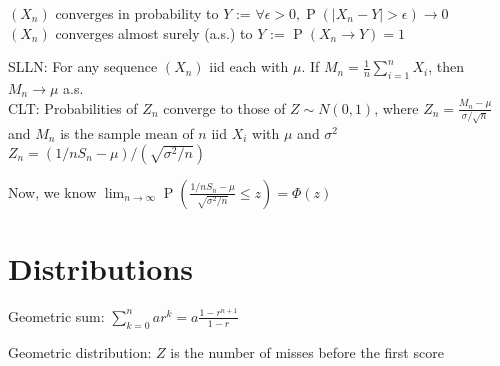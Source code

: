 \documentclass[12pt]{LatexTemplate/hw}
\renewcommand{\Pr}{\operatorname{P}}
\begin{document}
$(X_n)$ converges in probability to $Y$ := $\forall \epsilon>0, \Pr(|X_n-Y|>\epsilon)\to 0$\\
$(X_n)$ converges almost surely (a.s.) to $Y$ := $\Pr(X_n\to Y)=1$

SLLN: For any sequence $(X_n)$ iid each with $\mu$. If $M_n=\frac{1}{n}\sum_{i=1}^n X_i$, then $M_n\to \mu$ a.s.\\

CLT: Probabilities of $Z_n$ converge to those of $Z\sim N(0,1)$, where $Z_n=\frac{M_n-\mu}{\sigma/\sqrt{n}}$ and $M_n$ is the sample mean of $n$ iid $X_i$ with $\mu$ and $\sigma^2$\\
$Z_n=(1/n S_n - \mu)/(\sqrt{\sigma^2/n})$ 

Now, we know $\lim_{n\to\infty} \Pr(\frac{1/n S_n - \mu}{\sqrt{\sigma^2/n}}\le z)=\Phi(z)$



\section{Distributions}

Geometric sum: $\sum_{k=0}^n ar^k=a\frac{1-r^{n+1}}{1-r}$

Geometric distribution: $Z$ is the number of misses before the first score

\end{document}
